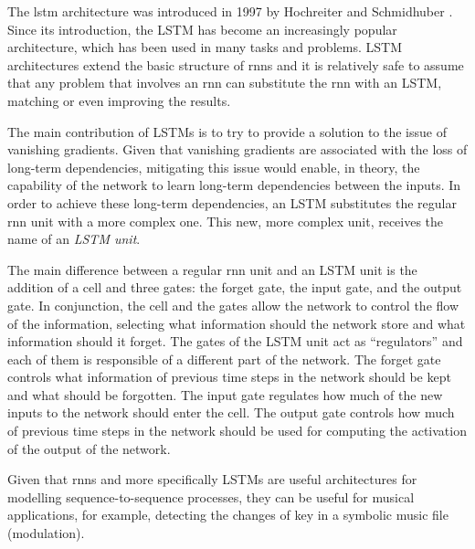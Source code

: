 

The \gls{lstm} architecture was
introduced in 1997 by Hochreiter and Schmidhuber
\parencite{hochreiter1997long}. Since its introduction, the
LSTM has become an increasingly popular architecture, which
has been used in many tasks and problems. LSTM architectures
extend the basic structure of \glspl{rnn} and it is relatively safe
to assume that any problem that involves an \gls{rnn} can
substitute the \gls{rnn} with an LSTM, matching or even improving
the results.

The main contribution of LSTMs is to try to provide a
solution to the issue of vanishing gradients. Given that
vanishing gradients are associated with the loss of
long-term dependencies, mitigating this issue would enable,
in theory, the capability of the network to learn long-term
dependencies between the inputs. In order to achieve these
long-term dependencies, an LSTM substitutes the regular \gls{rnn}
unit with a more complex one. This new, more complex unit,
receives the name of an \emph{LSTM unit}.

The main difference between a regular \gls{rnn} unit and an LSTM
unit is the addition of a cell and three gates: the forget
gate, the input gate, and the output gate. In conjunction,
the cell and the gates allow the network to control the flow
of the information, selecting what information should the
network store and what information should it forget. The
gates of the LSTM unit act as ``regulators'' and each of
them is responsible of a different part of the network. The
forget gate controls what information of previous time steps
in the network should be kept and what should be forgotten.
The input gate regulates how much of the new inputs to the
network should enter the cell. The output gate controls how
much of previous time steps in the network should be used
for computing the activation of the output of the network.

Given that \glspl{rnn} and more specifically LSTMs are useful
architectures for modelling sequence-to-sequence processes,
they can be useful for musical applications, for example,
detecting the changes of key in a symbolic music file
(modulation).


